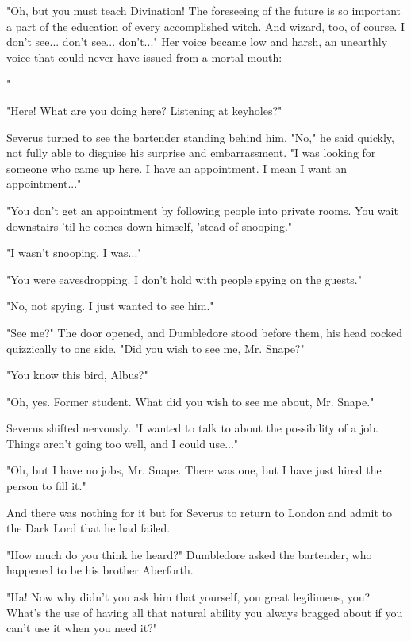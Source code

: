 "Oh, but you must teach Divination! The foreseeing of the future is so important a part of the education of every accomplished witch. And wizard, too, of course. I don't see... don't see... don't..." Her voice became low and harsh, an unearthly voice that could never have issued from a mortal mouth:


"

"Here! What are you doing here? Listening at keyholes?"

Severus turned to see the bartender standing behind him. "No," he said quickly, not fully able to disguise his surprise and embarrassment. "I was looking for someone who came up here. I have an appointment. I mean I want an appointment..."

"You don't get an appointment by following people into private rooms. You wait downstairs 'til he comes down himself, 'stead of snooping."

"I wasn't snooping. I was..."

"You were eavesdropping. I don't hold with people spying on the guests."

"No, not spying. I just wanted to see him."

"See me?" The door opened, and Dumbledore stood before them, his head cocked quizzically to one side. "Did you wish to see me, Mr. Snape?"

"You know this bird, Albus?"

"Oh, yes. Former student. What did you wish to see me about, Mr. Snape."

Severus shifted nervously. "I wanted to talk to about the possibility of a job. Things aren't going too well, and I could use..."

"Oh, but I have no jobs, Mr. Snape. There was one, but I have just hired the person to fill it."

And there was nothing for it but for Severus to return to London and admit to the Dark Lord that he had failed.

"How much do you think he heard?" Dumbledore asked the bartender, who happened to be his brother Aberforth.

"Ha! Now why didn't you ask him that yourself, you great legilimens, you? What's the use of having all that natural ability you always bragged about if you can't use it when you need it?"

